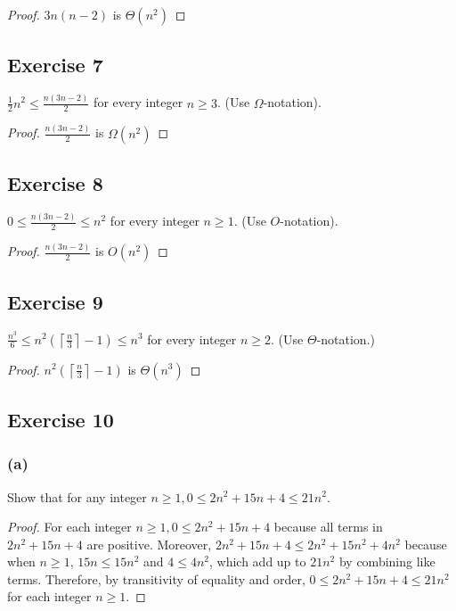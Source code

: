 \documentclass[14pt]{extarticle}
\newcommand{\dps}{\displaystyle}
\newcommand{\ceil}[1]{{\left\lceil#1\right\rceil}}
\begin{document}
\begin{proof}
    \(3n(n - 2)\) is \(\Theta(n^2)\)
\end{proof}

\subsection{Exercise 7}
\(\dps \frac{1}{2}n^2 \leq \frac{n(3n-2)}{2}\) for every integer \(n \geq 3\). (Use \(\Omega\)-notation).

\begin{proof}
    \(\dps \frac{n(3n-2)}{2}\) is \(\Omega(n^2)\)
\end{proof}

\subsection{Exercise 8}
\(\dps 0 \leq \frac{n(3n-2)}{2} \leq n^2\) for every integer \(n \geq 1\). (Use \(O\)-notation).

\begin{proof}
    \(\dps \frac{n(3n-2)}{2}\) is \(O(n^2)\)
\end{proof}

\subsection{Exercise 9}
\(\dps \frac{n^3}{6} \leq n^2 \left(\ceil{\frac{n}{3}} - 1\right) \leq n^3\) for every integer \(n \geq 2\).
(Use \(\Theta\)-notation.)

\begin{proof}
    \(\dps n^2\left(\ceil{\frac{n}{3}} - 1\right)\) is \(\Theta(n^3)\)
\end{proof}

\subsection{Exercise 10}
\subsubsection{(a)}
Show that for any integer \(n \geq 1, 0 \leq 2n^2 + 15n + 4 \leq 21n^2\).

\begin{proof}
    For each integer \(n \geq 1, 0 \leq 2n^2 + 15n + 4\) because all terms in \(2n^2 + 15n + 4\) are positive. Moreover,
    \(2n^2 + 15n + 4 \leq 2n^2 + 15n^2 + 4n^2\) because when \(n \geq 1\), \(15n \leq 15n^2\) and \(4 \leq 4n^2\), which add up
    to \(21n^2\) by combining like terms. Therefore, by transitivity of equality and order, \(0 \leq 2n^2 + 15n + 4
    \leq 21n^2\) for each integer \(n \geq 1\).
\end{proof}
\end{document}

